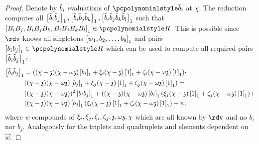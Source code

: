 \begin{proof}
Denote by $\tilde{b}_i$ evaluations of $\p{\tb}_i$ at $\chi$.  The reduction computes
all
$\left[\tilde{b}_i \tilde{b}_j\right]_{1}, \left[\tilde{b}_i \tilde{b}_j \tilde{b}_k\right]_{1}, \left[\tilde{b}_i \tilde{b}_j \tilde{b}_k \tilde{b}_l\right]_{1}$
such that $\gone{B_i B_j, B_i B_j B_k, B_i B_j B_k B_l} \in \pR$.  This is
possible since $\rdv$ knows all singletons $\left[w_1, b_2, \ldots, b_9\right]_{1}$ and pairs
$\gone{b_i b_j} \in \pR$ which can be used to compute all required pairs
$\left[\tilde{b}_i \tilde{b}_j\right]_{1}$:
\begin{align*}
\left[\tilde{b}_i \tilde{b}_j\right]_{1} 
& = ((\chi - \mathfrak{z})(\chi - {\omega \mathfrak{z}})\left[b_i\right]_{1} + \xi_i (\chi - \mathfrak{z})\left[1\right]_{1} +
\zeta_i (\chi - {\omega \mathfrak{z}}) \left[1\right]_{1}) 
\cdot \\
 & ((\chi - \mathfrak{z})(\chi - {\omega \mathfrak{z}})\left[b_j\right]_{1} + \xi_j (\chi - \mathfrak{z})\left[1\right]_{1} +
\zeta_j (\chi - {\omega \mathfrak{z}}) \left[1\right]_{1}) = \\
 & ((\chi - \mathfrak{z})(\chi - {\omega \mathfrak{z}}))^2 \left[b_i b_j\right]_{1} +  ((\chi - \mathfrak{z})(\chi -
 {\omega \mathfrak{z}})\left[b_i\right]_{1} (\xi_j (\chi - \mathfrak{z}) \left[1\right]_{1} + \zeta_j (\chi - {\omega \mathfrak{z}})
 \left[1\right]_{1}) + \\
 & ((\chi - \mathfrak{z})(\chi -
 {\omega \mathfrak{z}})\left[b_j\right]_{1} (\xi_i (\chi - \mathfrak{z}) \left[1\right]_{1} + \zeta_i (\chi - {\omega \mathfrak{z}})
 \left[1\right]_{1}) + \psi,
\end{align*}
where $\psi$ compounds of $\xi_i, \xi_j, \zeta_i, \zeta_j, \mathfrak{z}, {\omega \mathfrak{z}}, \chi$ which
are all known by $\rdv$ and no $b_i$ nor $b_j$.
Analogously for the triplets and quadruplets and elements dependent on~$\vec{w}$. 


\end{proof}
